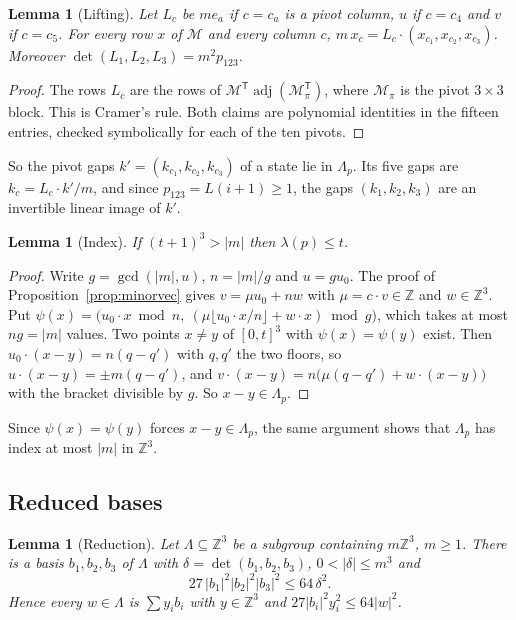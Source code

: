 \documentclass[11pt]{amsart}
\newtheorem{lemma}[theorem]{Lemma}
\theoremstyle{definition}
\theoremstyle{remark}
\begin{document}
\begin{lemma}[Lifting]\label{lem:lift}
Let $L_c$ be $me_a$ if $c=c_a$ is a pivot column, $u$ if $c=c_4$ and $v$ if $c=c_5$. For every
row $x$ of $\mathcal M$ and every column $c$, $m\,x_c=L_c\cdot(x_{c_1},x_{c_2},x_{c_3})$.
Moreover $\det(L_1,L_2,L_3)=m^2p_{123}$.
\end{lemma}

\begin{proof}
The rows $L_c$ are the rows of $\mathcal M^{\mathsf T}\operatorname{adj}(\mathcal M_\pi^{\mathsf
T})$, where $\mathcal M_\pi$ is the pivot $3\times3$ block. This is Cramer's rule. Both claims
are polynomial identities in the fifteen entries, checked symbolically for each of the ten
pivots.
\end{proof}

So the pivot gaps $k'=(k_{c_1},k_{c_2},k_{c_3})$ of a state lie in $\Lambda_p$. Its five gaps
are $k_c=L_c\cdot k'/m$, and since $p_{123}=L(i+1)\ge1$, the gaps $(k_1,k_2,k_3)$ are an
invertible linear image of $k'$.

\begin{lemma}[Index]\label{lem:index}
If $(t+1)^3>|m|$ then $\lambda(p)\le t$.
\end{lemma}

\begin{proof}
Write $g=\gcd(|m|,u)$, $n=|m|/g$ and $u=gu_0$. The proof of Proposition~\ref{prop:minorvec}
gives $v=\mu u_0+nw$ with $\mu=c\cdot v\in\mathbb Z$ and $w\in\mathbb Z^3$. Put
$\psi(x)=\bigl(u_0\cdot x\bmod n,\ (\mu\lfloor u_0\cdot x/n\rfloor+w\cdot x)\bmod g\bigr)$,
which takes at most $ng=|m|$ values. Two points $x\ne y$ of $[0,t]^3$ with
$\psi(x)=\psi(y)$ exist. Then $u_0\cdot(x-y)=n(q-q')$ with $q,q'$ the two floors, so
$u\cdot(x-y)=\pm m(q-q')$, and $v\cdot(x-y)=n\bigl(\mu(q-q')+w\cdot(x-y)\bigr)$ with the
bracket divisible by $g$. So $x-y\in\Lambda_p$.
\end{proof}

Since $\psi(x)=\psi(y)$ forces $x-y\in\Lambda_p$, the same argument shows that $\Lambda_p$ has
index at most $|m|$ in $\mathbb Z^3$.

\subsection{Reduced bases}

\begin{lemma}[Reduction]\label{lem:reduce}
Let $\Lambda\subseteq\mathbb Z^3$ be a subgroup containing $m\mathbb Z^3$, $m\ge1$. There is a
basis $b_1,b_2,b_3$ of $\Lambda$ with $\delta=\det(b_1,b_2,b_3)$, $0<|\delta|\le m^3$ and
\[
27\,|b_1|^2|b_2|^2|b_3|^2\le64\,\delta^2 .
\]
Hence every $w\in\Lambda$ is $\sum y_ib_i$ with $y\in\mathbb Z^3$ and $27|b_i|^2y_i^2\le64|w|^2$.
\end{lemma}
\end{document}
